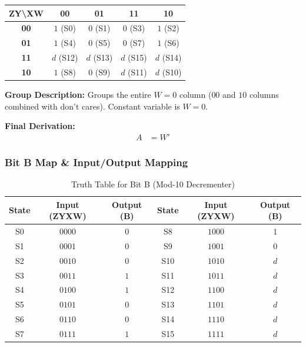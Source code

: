 \documentclass[journal,12pt,onecolumn]{IEEEtran}
\begin{document}
		\begin{table}[H]
			\centering
			\begin{tabular}{|c|c|c|c|c|}
				\hline
				\textbf{ZY\textbackslash XW} & \textbf{00} & \textbf{01} & \textbf{11} & \textbf{10} \\
				\hline
				\textbf{00} & \cellcolor{grpRed}$1$ (S0) & $0$ (S1) & $0$ (S3) & \cellcolor{grpRed}$1$ (S2) \\
				\hline
				\textbf{01} & \cellcolor{grpRed}$1$ (S4) & $0$ (S5) & $0$ (S7) & \cellcolor{grpRed}$1$ (S6) \\
				\hline
				\textbf{11} & \cellcolor{grpRed}$d$ (S12) & $d$ (S13) & $d$ (S15) & \cellcolor{grpRed}$d$ (S14) \\
				\hline
				\textbf{10} & \cellcolor{grpRed}$1$ (S8) & $0$ (S9) & \cellcolor{grpRed}$d$ (S11) & \cellcolor{grpRed}$d$ (S10) \\
				\hline
			\end{tabular}
		\end{table}
		
		\begin{justify}
			\textbf{Group Description:} Groups the entire $W=0$ column ($00$ and $10$ columns combined with don't cares). Constant variable is $W=0$.
			
			\textbf{Final Derivation:}
			\begin{align}
				A &= W'
			\end{align}
		\end{justify}
		
		\vspace{1em}
		\subsubsection{Bit B Map \& Input/Output Mapping}
		
		\begin{table}[H]
			\centering
			\begin{tabular}{|c|c|c||c|c|c|}
				\hline
				\textbf{State} & \textbf{Input (ZYXW)} & \textbf{Output (B)} & \textbf{State} & \textbf{Input (ZYXW)} & \textbf{Output (B)} \\
				\hline
				S0 & $0000$ & $0$ & S8 & $1000$ & $1$ \\
				\hline
				S1 & $0001$ & $0$ & S9 & $1001$ & $0$ \\
				\hline
				S2 & $0010$ & $0$ & S10 & $1010$ & $d$ \\
				\hline
				S3 & $0011$ & $1$ & S11 & $1011$ & $d$ \\
				\hline
				S4 & $0100$ & $1$ & S12 & $1100$ & $d$ \\
				\hline
				S5 & $0101$ & $0$ & S13 & $1101$ & $d$ \\
				\hline
				S6 & $0110$ & $0$ & S14 & $1110$ & $d$ \\
				\hline
				S7 & $0111$ & $1$ & S15 & $1111$ & $d$ \\
				\hline
			\end{tabular}
			\caption{Truth Table for Bit B (Mod-10 Decrementer)}
		\end{table}
		
\end{document}
